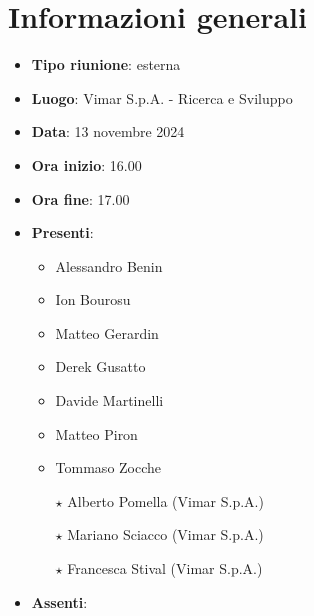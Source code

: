 \section{Informazioni generali}
\begin{itemize}
  \item \textbf{Tipo riunione}: esterna
  \item \textbf{Luogo}: Vimar S.p.A. - Ricerca e Sviluppo 
  \item \textbf{Data}: 13 novembre 2024
  \item \textbf{Ora inizio}: 16.00
  \item \textbf{Ora fine}: 17.00
  
  \item \textbf{Presenti}:
  \begin{itemize}
    \item Alessandro Benin
    \item Ion Bourosu
    \item Matteo Gerardin
    \item Derek Gusatto
    \item Davide Martinelli
    \item Matteo Piron
    \item Tommaso Zocche
    \item[$\star$] Alberto Pomella (Vimar S.p.A.)
    \item[$\star$] Mariano Sciacco (Vimar S.p.A.)
    \item[$\star$] Francesca Stival (Vimar S.p.A.)
    
  \end{itemize}

  \item \textbf{Assenti}:
 
\end{itemize}